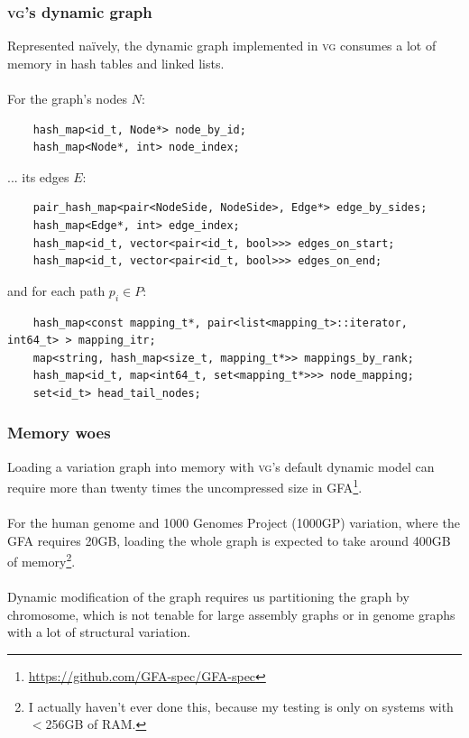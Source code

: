 \documentclass{beamer}
\begin{document}
\begin{frame}[fragile]
  \frametitle{\textsc{vg}'s dynamic graph}
  Represented naïvely, the dynamic graph implemented in \textsc{vg} consumes a lot of memory in hash tables and linked lists.
  \\~\\
  For the graph's nodes $N$:
  \begin{lstlisting}
    hash_map<id_t, Node*> node_by_id;
    hash_map<Node*, int> node_index;
  \end{lstlisting}
  ... its edges $E$:
  \begin{lstlisting}
    pair_hash_map<pair<NodeSide, NodeSide>, Edge*> edge_by_sides;
    hash_map<Edge*, int> edge_index;
    hash_map<id_t, vector<pair<id_t, bool>>> edges_on_start;
    hash_map<id_t, vector<pair<id_t, bool>>> edges_on_end;
  \end{lstlisting}
  and for each path $p_i \in P$:
  \begin{lstlisting}
    hash_map<const mapping_t*, pair<list<mapping_t>::iterator, int64_t> > mapping_itr;
    map<string, hash_map<size_t, mapping_t*>> mappings_by_rank;
    hash_map<id_t, map<int64_t, set<mapping_t*>>> node_mapping;
    set<id_t> head_tail_nodes;
  \end{lstlisting}
\end{frame}

\begin{frame}
  \frametitle{Memory woes}
  Loading a variation graph into memory with \textsc{vg}'s default dynamic model can require more than twenty times the uncompressed size in GFA\footnote{\url{https://github.com/GFA-spec/GFA-spec}}.
  \\~\\
  For the human genome and 1000 Genomes Project (1000GP) variation, where the GFA requires 20GB, loading the whole graph is expected to take around 400GB of memory\footnote{I actually haven't ever done this, because my testing is only on systems with $<$256GB of RAM.}.
  \\~\\
  Dynamic modification of the graph requires us partitioning the graph by chromosome, which is not tenable for large assembly graphs or in genome graphs with a lot of structural variation.
\end{frame}
\end{document}
